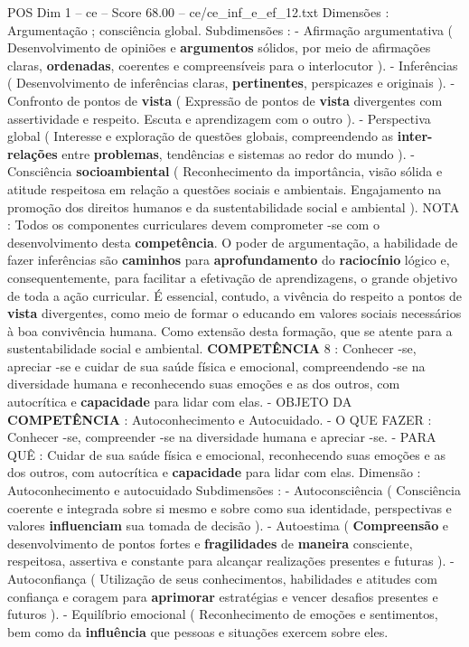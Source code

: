 \begin{textsample}{POS Dim 1 – ce – Score 68.00 – ce/ce\_inf\_e\_ef\_12.txt}
Dimensões : Argumentação ; consciência global.
Subdimensões : - Afirmação argumentativa ( Desenvolvimento de opiniões e \textbf{argumentos} sólidos, por meio de afirmações claras, \textbf{ordenadas}, coerentes e compreensíveis para o interlocutor ). - Inferências ( Desenvolvimento de inferências claras, \textbf{pertinentes}, perspicazes e originais ). - Confronto de pontos de \textbf{vista} ( Expressão de pontos de \textbf{vista} divergentes com assertividade e respeito.
Escuta e aprendizagem com o outro ). - Perspectiva global ( Interesse e exploração de questões globais, compreendendo as \textbf{inter-relações} entre \textbf{problemas}, tendências e sistemas ao redor do mundo ). - Consciência \textbf{socioambiental} ( Reconhecimento da importância, visão sólida e atitude respeitosa em relação a questões sociais e ambientais.
Engajamento na promoção dos direitos humanos e da sustentabilidade social e ambiental ).
NOTA : Todos os componentes curriculares devem comprometer -se com o desenvolvimento desta \textbf{competência}.
O poder de argumentação, a habilidade de fazer inferências são \textbf{caminhos} para \textbf{aprofundamento} do \textbf{raciocínio} lógico e, consequentemente, para facilitar a efetivação de aprendizagens, o grande objetivo de toda a ação curricular.
É essencial, contudo, a vivência do respeito a pontos de \textbf{vista} divergentes, como meio de formar o educando em valores sociais necessários à boa convivência humana.
Como extensão desta formação, que se atente para a sustentabilidade social e ambiental. \textbf{COMPETÊNCIA} 8 : Conhecer -se, apreciar -se e cuidar de sua saúde física e emocional, compreendendo -se na diversidade humana e reconhecendo suas emoções e as dos outros, com autocrítica e \textbf{capacidade} para lidar com elas. - OBJETO DA \textbf{COMPETÊNCIA} : Autoconhecimento e Autocuidado. - O QUE FAZER : Conhecer -se, compreender -se na diversidade humana e apreciar -se. - PARA QUÊ : Cuidar de sua saúde física e emocional, reconhecendo suas emoções e as dos outros, com autocrítica e \textbf{capacidade} para lidar com elas.
Dimensão : Autoconhecimento e autocuidado Subdimensões : - Autoconsciência ( Consciência coerente e integrada sobre si mesmo e sobre como sua identidade, perspectivas e valores \textbf{influenciam} sua tomada de decisão ). - Autoestima ( \textbf{Compreensão} e desenvolvimento de pontos fortes e \textbf{fragilidades} de \textbf{maneira} consciente, respeitosa, assertiva e constante para alcançar realizações presentes e futuras ). - Autoconfiança ( Utilização de seus conhecimentos, habilidades e atitudes com confiança e coragem para \textbf{aprimorar} estratégias e vencer desafios presentes e futuros ). - Equilíbrio emocional ( Reconhecimento de emoções e sentimentos, bem como da \textbf{influência} que pessoas e situações exercem sobre eles.

\end{textsample}

